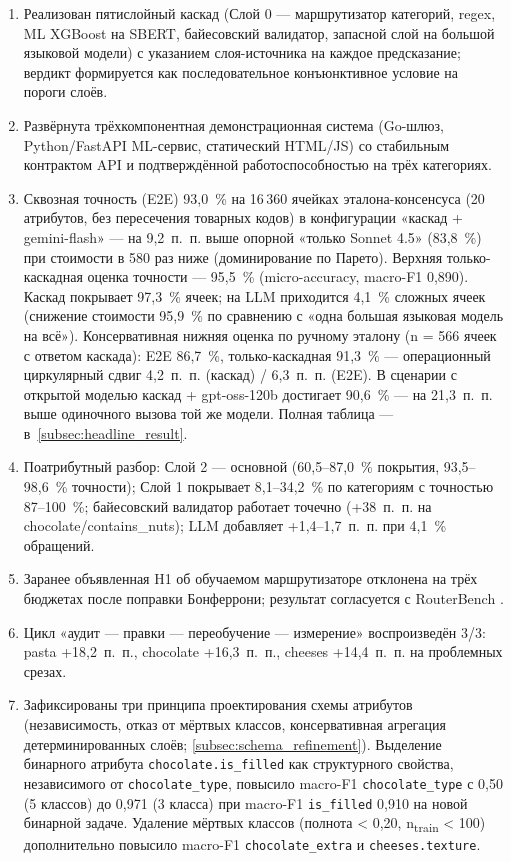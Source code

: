 \begin{enumerate}[label=\arabic*)]
    \item Реализован пятислойный каскад (Слой 0 — маршрутизатор категорий, regex, ML XGBoost на SBERT, байесовский валидатор, запасной слой на большой языковой модели) с указанием слоя-источника на каждое предсказание; вердикт формируется как последовательное конъюнктивное условие на пороги слоёв.
    \item Развёрнута трёхкомпонентная демонстрационная система (Go-шлюз, Python/FastAPI ML-сервис, статический HTML/JS) со стабильным контрактом API и подтверждённой работоспособностью на трёх категориях.
    \item Сквозная точность (E2E) 93,0~\% на 16\,360 ячейках эталона-консенсуса (20 атрибутов, без пересечения товарных кодов) в конфигурации «каскад + gemini-flash» — на 9,2~п.~п. выше опорной «только Sonnet 4.5» (83,8~\%) при стоимости в 580 раз ниже (доминирование по Парето). Верхняя только-каскадная оценка точности — 95,5~\% (micro-accuracy, macro-F1 0,890). Каскад покрывает 97,3~\% ячеек; на LLM приходится 4,1~\% сложных ячеек (снижение стоимости 95,9~\% по сравнению с «одна большая языковая модель на всё»). Консервативная нижняя оценка по ручному эталону (n = 566 ячеек с ответом каскада): E2E 86,7~\%, только-каскадная 91,3~\% --- операционный циркулярный сдвиг 4,2~п.~п. (каскад) / 6,3~п.~п. (E2E). В сценарии с открытой моделью каскад + gpt-oss-120b достигает 90,6~\% — на 21,3~п.~п. выше одиночного вызова той же модели. Полная таблица — в~\ref{subsec:headline_result}.
    \item Поатрибутный разбор: Слой 2 — основной (60,5--87,0~\% покрытия, 93,5--98,6~\% точности); Слой 1 покрывает 8,1--34,2~\% по категориям с точностью 87--100~\%; байесовский валидатор работает точечно (+38~п.~п. на chocolate/contains\_nuts); LLM добавляет +1,4--1,7~п.~п. при 4,1~\% обращений.
    \item Заранее объявленная H1 об обучаемом маршрутизаторе отклонена на трёх бюджетах после поправки Бонферрони; результат согласуется с RouterBench \cite{ref_12}.
    \item Цикл «аудит — правки — переобучение — измерение» воспроизведён 3/3: pasta +18,2~п.~п., chocolate +16,3~п.~п., cheeses +14,4~п.~п. на проблемных срезах.
    \item Зафиксированы три принципа проектирования схемы атрибутов (независимость, отказ от мёртвых классов, консервативная агрегация детерминированных слоёв; \ref{subsec:schema_refinement}). Выделение бинарного атрибута \texttt{chocolate.is\_filled} как структурного свойства, независимого от \texttt{chocolate\_type}, повысило macro-F1 \texttt{chocolate\_type} с 0,50 (5 классов) до 0,971 (3 класса) при macro-F1 \texttt{is\_filled} 0,910 на новой бинарной задаче. Удаление мёртвых классов (полнота < 0,20, n\textsubscript{train} < 100) дополнительно повысило macro-F1 \texttt{chocolate\_extra} и \texttt{cheeses.texture}.

\end{enumerate}
